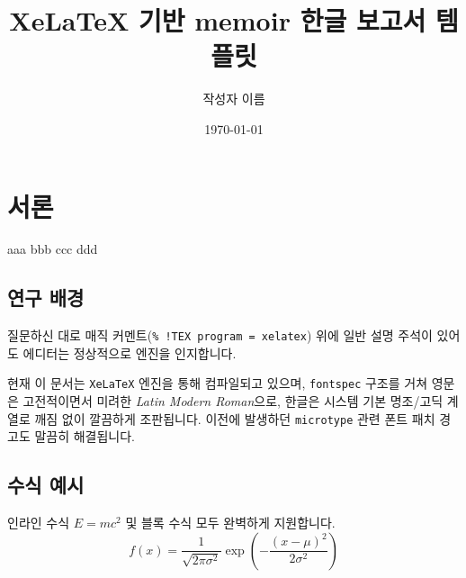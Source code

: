 \documentclass[12pt, a4paper, oneside]{memoir}
\title{XeLaTeX 기반 memoir 한글 보고서 템플릿}
\author{작성자 이름}
\date{\today}
\begin{document}
\maketitle
\tableofcontents
\newpage

\chapter{서론}
aaa
bbb
ccc
ddd
\section{연구 배경}
질문하신 대로 매직 커멘트(\texttt{\% !TEX program = xelatex}) 위에 일반 설명 주석이 있어도 에디터는 정상적으로 엔진을 인지합니다. 

현재 이 문서는 \texttt{XeLaTeX} 엔진을 통해 컴파일되고 있으며, \texttt{fontspec} 구조를 거쳐 영문은 고전적이면서 미려한 \textit{Latin Modern Roman}으로, 한글은 시스템 기본 명조/고딕 계열로 깨짐 없이 깔끔하게 조판됩니다. 이전에 발생하던 \texttt{microtype} 관련 폰트 패치 경고도 말끔히 해결됩니다.

\section{수식 예시}
인라인 수식 $E = mc^2$ 및 블록 수식 모두 완벽하게 지원합니다.
\begin{equation}
    f(x) = \frac{1}{\sqrt{2\pi\sigma^2}} \exp\left( -\frac{(x-\mu)^2}{2\sigma^2} \right)
\end{equation}
\end{document}
